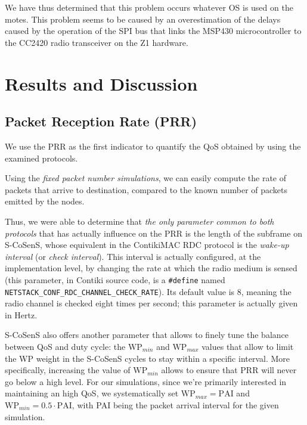 \documentclass[conference]{IEEEtran}
\begin{document}
We have thus determined that this problem occurs whatever OS is used
on the motes. This problem seems to be caused by an overestimation
of the delays caused by the operation of the SPI bus that links
the MSP430 microcontroller to the CC2420 radio transceiver
on the Z1 hardware.



\section{Results and Discussion}
\label{SectResults}

\subsection{Packet Reception Rate (PRR)}

We use the PRR as the first indicator to quantify the QoS obtained by
using the examined protocols.

Using the \emph{fixed packet number simulations}, we can easily compute the
rate of packets that arrive to destination, compared to the known number
of packets emitted by the nodes.

Thus, we were able to determine that \emph{the only parameter common to
both protocols} that has actually influence on the PRR is the length of
the subframe on S-CoSenS, whose equivalent in the ContikiMAC RDC protocol
is the \emph{wake-up interval} (or \emph{check interval}). This interval
is actually configured, at the implementation level, by changing the rate
at which the radio medium is sensed (this parameter, in Contiki source code,
is a \texttt{\#define} named
\texttt{NETSTACK\_CONF\_RDC\_CHANNEL\_CHECK\_RATE}).
Its default value is 8, meaning the radio channel is checked eight times
per second; this parameter is actually given in Hertz.

S-CoSenS also offers another parameter that allows to finely tune the
balance between QoS and duty cycle: the $\mathrm{WP}_{min}$ and
$\mathrm{WP}_{max}$ values that allow to limit the WP weight in the
S-CoSenS cycles to stay within a specific interval. More specifically,
increasing the value of $\mathrm{WP}_{min}$ allows to ensure that PRR
will never go below a high level. For our simulations, since we're
primarily interested in maintaining an high QoS, we systematically
set $\mathrm{WP}_{max} = \mathrm{PAI}$ and $\mathrm{WP}_{min}
= 0.5 \cdot \mathrm{PAI}$, with PAI being the packet arrival
interval for the given simulation.
\end{document}
